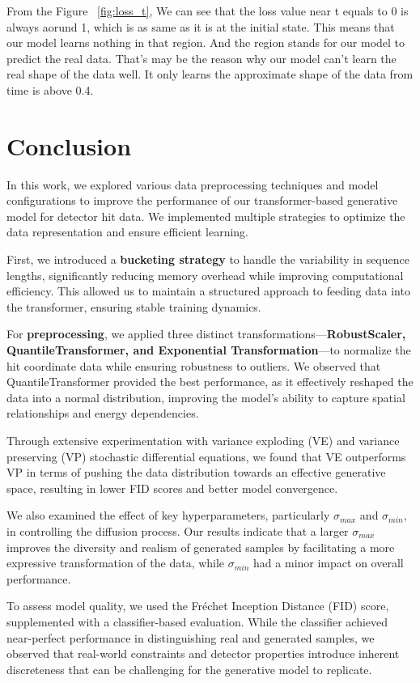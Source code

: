 From the Figure ~\ref{fig:loss_t}, We can see that the loss value near t equals to 0 is always aorund 1, which is as same as it is at the initial state. This means that our model learns nothing in that region. And the region stands for our model to predict the real data. That's may be the reason why our model can't learn the real shape of the data well. It only learns the approximate shape of the data from time is above 0.4.

\section{Conclusion}

In this work, we explored various data preprocessing techniques and model configurations to improve the performance of our transformer-based generative model for detector hit data. We implemented multiple strategies to optimize the data representation and ensure efficient learning.

First, we introduced a \textbf{bucketing strategy} to handle the variability in sequence lengths, significantly reducing memory overhead while improving computational efficiency. This allowed us to maintain a structured approach to feeding data into the transformer, ensuring stable training dynamics.

For \textbf{preprocessing}, we applied three distinct transformations—\textbf{RobustScaler, QuantileTransformer, and Exponential Transformation}—to normalize the hit coordinate data while ensuring robustness to outliers. We observed that QuantileTransformer provided the best performance, as it effectively reshaped the data into a normal distribution, improving the model's ability to capture spatial relationships and energy dependencies.

Through extensive experimentation with variance exploding (VE) and variance preserving (VP) stochastic differential equations, we found that VE outperforms VP in terms of pushing the data distribution towards an effective generative space, resulting in lower FID scores and better model convergence.

We also examined the effect of key hyperparameters, particularly $\sigma_{max}$ and $\sigma_{min}$, in controlling the diffusion process. Our results indicate that a larger $\sigma_{max}$ improves the diversity and realism of generated samples by facilitating a more expressive transformation of the data, while $\sigma_{min}$ had a minor impact on overall performance.

To assess model quality, we used the Fréchet Inception Distance (FID) score, supplemented with a classifier-based evaluation. While the classifier achieved near-perfect performance in distinguishing real and generated samples, we observed that real-world constraints and detector properties introduce inherent discreteness that can be challenging for the generative model to replicate.

